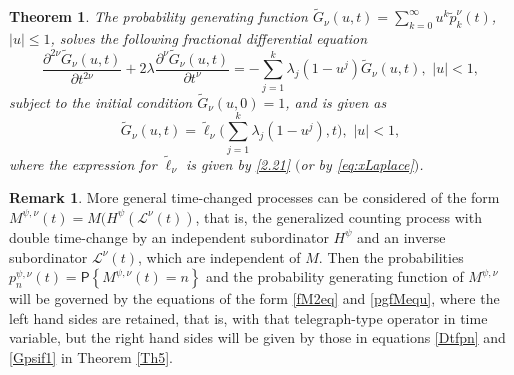 \documentclass[12pt]{article}
\theoremstyle{definition}
\newtheorem{remark}{Remark}
\theoremstyle{plain}
\newtheorem{theorem}{Theorem}
\newcommand{\Prob}{\mathsf{P}}
\begin{document}
\begin{theorem}\label{thpgfM}
	The probability generating function $%
	\tilde {G}_\nu(u, t) = \sum_{k=0}^{\infty} u^k \tilde{p}_k^\nu(t)$, $|u| \leq 1$, solves the following fractional differential equation
	\begin{equation}\label{pgfMequ}
		\frac{\partial^{2\nu} \tilde G_\nu(u, t)}{\partial t^{2\nu}} + 2\lambda \frac{\partial^\nu \tilde G_\nu(u, t)}{\partial t^\nu} = -\sum_{j=1}^{k}\lambda_j(1-u^j)\tilde G_\nu(u, t), \,\,|u| < 1,
	\end{equation}
	subject to the initial condition $\tilde {G}_\nu(u, 0) = 1$, and is given as
	\begin{equation}\label{pgfM}
		\tilde G_\nu(u, t) = \tilde \ell_\nu \Big(\sum_{j=1}^{k}\lambda_j(1-u^j), t\Big), \,\,|u| < 1,
	\end{equation}
	where the expression for $\tilde \ell_\nu$ is given by \eqref{2.21}  $($or by \eqref{eq:xLaplace}$)$.
	\end{theorem}


\begin{remark}
More general time-changed processes can be considered of the form   ${M}^{\psi,\nu}(t)=M(H^{\psi}(\mathcal{L}^\nu(t))$, that is, the generalized counting process with double time-change by an independent subordinator $H^{\psi}$ and an inverse subordinator $\mathcal{L}^\nu(t)$, which are independent of $M$. Then the probabilities ${p}_n^{\psi,\nu}(t)=\Prob\left\{{M}^{\psi,\nu}(t)=n\right\}$ and the probability generating function of ${M}^{\psi,\nu}$ will be governed by  the equations of the form \eqref{fM2eq} and \eqref{pgfMequ}, where the left hand sides are retained, that is, with that telegraph-type operator in time variable, but the right hand sides will be given by those in equations \eqref{Dtfpn} and \eqref{Gpsif1} in Theorem \ref{Th5}.
\end{remark}
\end{document}
